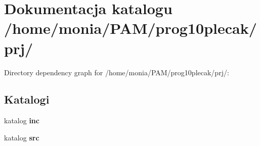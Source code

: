 \section{\-Dokumentacja katalogu /home/monia/\-P\-A\-M/prog10plecak/prj/}
\label{dir_79f8ee757588a493b1a6f500108cbae2}
\-Directory dependency graph for /home/monia/\-P\-A\-M/prog10plecak/prj/\-:
\subsection*{\-Katalogi}
\begin{DoxyCompactItemize}
\item 
katalog {\bf inc}
\item 
katalog {\bf src}
\end{DoxyCompactItemize}
